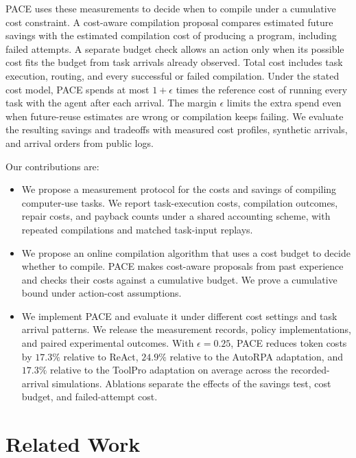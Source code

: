 PACE uses these measurements to decide when to compile under a cumulative cost constraint.
A cost-aware compilation proposal compares estimated future savings with the estimated compilation cost of producing a program, including failed attempts.
A separate budget check allows an action only when its possible cost fits the budget from task arrivals already observed.
Total cost includes task execution, routing, and every successful or failed compilation.
Under the stated cost model, PACE spends at most $1+\epsilon$ times the reference cost of running every task with the agent after each arrival.
The margin $\epsilon$ limits the extra spend even when future-reuse estimates are wrong or compilation keeps failing.
We evaluate the resulting savings and tradeoffs with measured cost profiles, synthetic arrivals, and arrival orders from public logs.

Our contributions are:
\begin{itemize}
\item We propose a measurement protocol for the costs and savings of compiling computer-use tasks.
We report task-execution costs, compilation outcomes, repair costs, and payback counts under a shared accounting scheme, with repeated compilations and matched task-input replays.
\item We propose an online compilation algorithm that uses a cost budget to decide whether to compile.
PACE makes cost-aware proposals from past experience and checks their costs against a cumulative budget.
We prove a cumulative bound under action-cost assumptions.
\item We implement PACE and evaluate it under different cost settings and task arrival patterns.
We release the measurement records, policy implementations, and paired experimental outcomes.
With $\epsilon=0.25$, PACE reduces token costs by $17.3\%$ relative to ReAct, $24.9\%$ relative to the AutoRPA adaptation, and $17.3\%$ relative to the ToolPro adaptation on average across the recorded-arrival simulations.
Ablations separate the effects of the savings test, cost budget, and failed-attempt cost.
\end{itemize}






\section{Related Work}
\label{sec:related}


